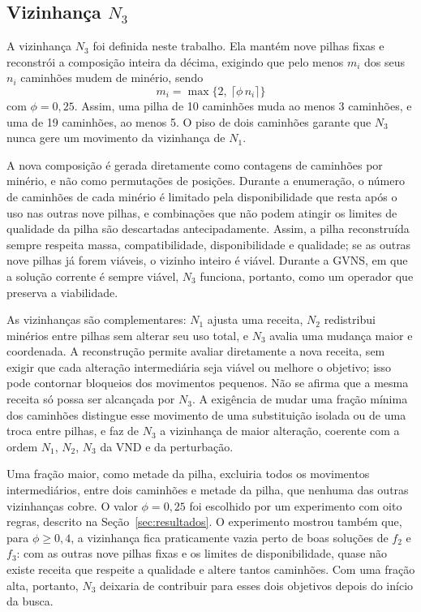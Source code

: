 \documentclass[conference]{IEEEtran}
\begin{document}
\subsection{Vizinhança $N_3$}

A vizinhança $N_3$ foi definida neste trabalho. Ela mantém nove pilhas fixas e reconstrói a composição inteira da décima, exigindo que pelo menos $m_i$ dos seus $n_i$ caminhões mudem de minério, sendo
\begin{equation}
m_i=\max\{2,\ \lceil \phi\, n_i\rceil\}
\label{eq:n3min}
\end{equation}
com $\phi=0{,}25$. Assim, uma pilha de 10 caminhões muda ao menos 3 caminhões, e uma de 19 caminhões, ao menos 5. O piso de dois caminhões garante que $N_3$ nunca gere um movimento da vizinhança de $N_1$.

A nova composição é gerada diretamente como contagens de caminhões por minério, e não como permutações de posições. Durante a enumeração, o número de caminhões de cada minério é limitado pela disponibilidade que resta após o uso nas outras nove pilhas, e combinações que não podem atingir os limites de qualidade da pilha são descartadas antecipadamente. Assim, a pilha reconstruída sempre respeita massa, compatibilidade, disponibilidade e qualidade; se as outras nove pilhas já forem viáveis, o vizinho inteiro é viável. Durante a GVNS, em que a solução corrente é sempre viável, $N_3$ funciona, portanto, como um operador que preserva a viabilidade.

As vizinhanças são complementares: $N_1$ ajusta uma receita, $N_2$ redistribui minérios entre pilhas sem alterar seu uso total, e $N_3$ avalia uma mudança maior e coordenada. A reconstrução permite avaliar diretamente a nova receita, sem exigir que cada alteração intermediária seja viável ou melhore o objetivo; isso pode contornar bloqueios dos movimentos pequenos. Não se afirma que a mesma receita só possa ser alcançada por $N_3$. A exigência de mudar uma fração mínima dos caminhões distingue esse movimento de uma substituição isolada ou de uma troca entre pilhas, e faz de $N_3$ a vizinhança de maior alteração, coerente com a ordem $N_1$, $N_2$, $N_3$ da VND e da perturbação.

Uma fração maior, como metade da pilha, excluiria todos os movimentos intermediários, entre dois caminhões e metade da pilha, que nenhuma das outras vizinhanças cobre. O valor $\phi=0{,}25$ foi escolhido por um experimento com oito regras, descrito na Seção~\ref{sec:resultados}. O experimento mostrou também que, para $\phi\geq0{,}4$, a vizinhança fica praticamente vazia perto de boas soluções de $f_2$ e $f_3$: com as outras nove pilhas fixas e os limites de disponibilidade, quase não existe receita que respeite a qualidade e altere tantos caminhões. Com uma fração alta, portanto, $N_3$ deixaria de contribuir para esses dois objetivos depois do início da busca.
\end{document}
